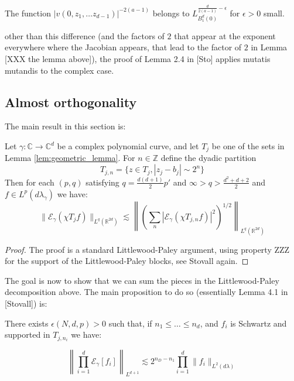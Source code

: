 	\begin{lemma}
		The function $|v(0, z_1, \dots z_{d-1})|^{-2(a-1)}$ belongs to $L^{\frac{d}{2(a-1)}-\epsilon}_{B_1^d(0)}$ for $\epsilon > 0$ small.
	\end{lemma}

	other than this difference (and the factors of $2$ that appear at the exponent everywhere where the Jacobian appears, that lead to the factor of $2$ in Lemma [XXX the lemma above]), the proof of Lemma 2.4 in [Sto] applies mutatis mutandis to the complex case.





	\subsection{Almost orthogonality} %
	\label{sub:almost_orthogonality}

	The main result in this section is:

	\begin{lemma}
		Let $\gamma:\mathbb C\to \mathbb C^d$ be a complex polynomial curve, and let $T_j$ be one of the sets in Lemma \ref{lem:geometric_lemma}. For $n\in \mathbb  Z$ define the dyadic partition
		\begin{equation}
			T_{j,n} = \{z \in T_j, |z_j - b_j| \sim 2^n\}
		\end{equation}
		Then for each $(p,q)$ satisfying $q= \frac{d(d+1)}{2}p'$ and $\infty > q > \frac{d^2+d+2}{2}$ and $f \in L^p(d\lambda_\gamma)$ we have:
		\begin{equation}
			\|\mathcal E_\gamma (\chi {T_j} f)\|_{L^q(\mathbb R^{2d})} \lesssim 
			\left\|
			\left(
				\sum_n |\mathcal E_\gamma (\chi {T_{j,n}} f)|^2
			\right)^{1/2}
			\right\|_{L^q(\mathbb R^{2d})}
		\end{equation}
	\end{lemma}

	\begin{proof}
		The proof is a standard Littlewood-Paley argument, using property ZZZ for the support of the Littlewood-Paley blocks, see Stovall again.
	\end{proof}
	


	The goal is now to show that we can sum the pieces in the Littlewood-Paley decomposition above. The main proposition to do so (essentially Lemma 4.1 in [Stovall]) is:

	\begin{lemma}
		There exists $\epsilon(N,d,p)>0$ such that, if $n_1 \le \dots \le n_d$, and $f_i$ is Schwartz and supported in $T_{j,n_i}$ we have:

		\begin{equation}
			\left \|\prod_{i=1}^d \mathcal E_\gamma [f_i]\right\|_{L^{d+1}} \lesssim 2^{n_D-n_1} \prod_{i=1}^d \|f_i\|_{L^2(d\lambda)}
		\end{equation}
	\end{lemma}
	

